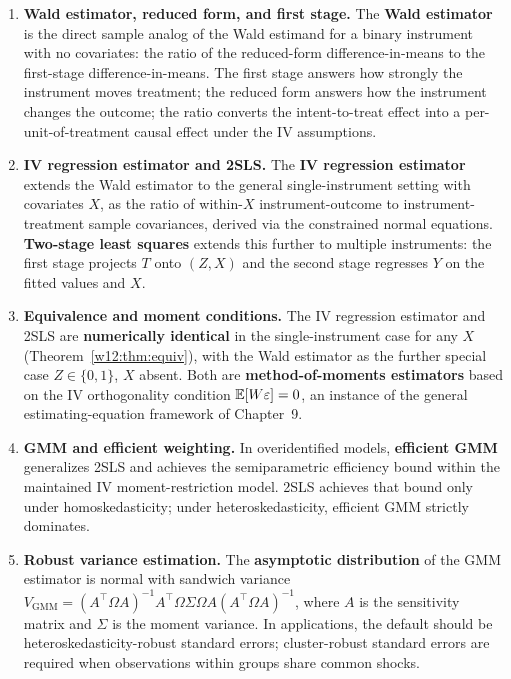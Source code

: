 \documentclass[master.tex]{subfiles}
\begin{document}
\begin{enumerate}
  \item \textbf{Wald estimator, reduced form, and first stage.}
    The \textbf{Wald estimator} is the direct sample analog of the
    Wald estimand for a binary instrument with no covariates: the
    ratio of the reduced-form difference-in-means to the first-stage
    difference-in-means.  The first stage answers how strongly the
    instrument moves treatment; the reduced form answers how the
    instrument changes the outcome; the ratio converts the
    intent-to-treat effect into a per-unit-of-treatment causal effect
    under the IV assumptions.

  \item \textbf{IV regression estimator and 2SLS.}
    The \textbf{IV regression estimator} extends the Wald estimator
    to the general single-instrument setting with covariates $X$, as
    the ratio of within-$X$ instrument-outcome to
    instrument-treatment sample covariances, derived via the
    constrained normal equations.  \textbf{Two-stage least squares}
    extends this further to multiple instruments: the first stage
    projects $T$ onto $(Z, X)$ and the second stage regresses $Y$
    on the fitted values and $X$.

  \item \textbf{Equivalence and moment conditions.}
    The IV regression estimator and 2SLS are \textbf{numerically
    identical} in the single-instrument case for any $X$
    (Theorem~\ref{w12:thm:equiv}), with the Wald estimator as the
    further special case $Z \in \{0,1\}$, $X$ absent.  Both are
    \textbf{method-of-moments estimators} based on the IV
    orthogonality condition $\mathbb{E}[W\varepsilon] = 0$, an instance of
    the general estimating-equation framework of Chapter~9.

  \item \textbf{GMM and efficient weighting.}
    In overidentified models, \textbf{efficient GMM} generalizes
    2SLS and achieves the semiparametric efficiency bound within the
    maintained IV moment-restriction model.  2SLS achieves that bound
    only under homoskedasticity; under heteroskedasticity, efficient
    GMM strictly dominates.

  \item \textbf{Robust variance estimation.}
    The \textbf{asymptotic distribution} of the GMM estimator is
    normal with sandwich variance
    $V_{\mathrm{GMM}} = (A^\top\Omega A)^{-1} A^\top\Omega\Sigma\Omega A
    (A^\top\Omega A)^{-1}$, where $A$ is the sensitivity matrix and
    $\Sigma$ is the moment variance.  In applications, the default
    should be heteroskedasticity-robust standard errors; cluster-robust
    standard errors are required when observations within groups share
    common shocks.


\end{enumerate}
\end{document}

